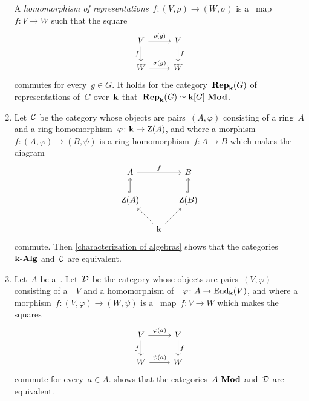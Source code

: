 \begin{example}
\begin{enumerate}
      A \emph{homomorphism of representations}~$f \colon (V, \rho) \to (W,\sigma)$ is a~{\klin} map~$f \colon V \to W$ such that the square
      \[
        \begin{tikzcd}
            V
            \arrow{r}[above]{\rho(g)}
            \arrow{d}[left]{f}
          & V
            \arrow{d}[right]{f}
          \\
            W
            \arrow{r}[above]{\sigma(g)}
          & W
        \end{tikzcd}
      \]
      commutes for every~$g \in G$.
      It holds for the category~$\mathbf{Rep}_{\mathbf{k}}(G)$ of representations of~$G$ over~$\kf$ that~$\mathbf{Rep}_{\mathbf{k}}(G) \simeq \text{$\mathbf{k}[G]$-$\mathbf{Mod}$}$.
    \item
      Let~$\mathcal{C}$ be the category whose objects are pairs~$(A, \varphi)$ consisting of a ring~$A$ and a ring homomorphism~$\varphi \colon \mathbf{k} \to \operatorname{Z}(A)$, and where a morphism~$f \colon (A, \varphi) \to (B, \psi)$ is a ring homomorphism~$f \colon A \to B$ which makes the diagram
      \[
        \begin{tikzcd}[column sep = small]
            A
            \arrow{rr}[above]{f}
          & {}
          & B
          \\
            \ringcenter(A)
            \arrow[hook]{u}
          & {}
          & \ringcenter(B)
            \arrow[hook]{u}
          \\
            {}
          & \kf
            \arrow{ul}
            \arrow{ur}
          & {}
        \end{tikzcd}
      \]
      commute.
      Then \cref{characterization of algebras} shows that the categories~$\text{$\mathbf{k}$-$\mathbf{Alg}$}$ and~$\mathcal{C}$ are equivalent.
    \item
      Let~$A$ be a~{\kalg}.
      Let~$\mathcal{D}$ be the category whose objects are pairs~$(V, \varphi)$ consisting of a~{\module{$\kf$}}~$V$ and a homomorphism of~{\kalgs}~$\varphi \colon A \to \operatorname{End}_{\mathbf{k}}(V)$, and where a morphism~$f \colon (V,\varphi) \to (W,\psi)$ is a~{\klin} map~$f \colon V \to W$ which makes the squares
      \[
        \begin{tikzcd}
            V
            \arrow{r}[above]{\varphi(a)}
            \arrow{d}[left]{f}
          & V
            \arrow{d}[right]{f}
          \\
            W
            \arrow{r}[above]{\psi(a)}
          & W
        \end{tikzcd}
      \]
      commute for every~$a \in A$.
       shows that the categories~$\text{$A$-$\mathbf{Mod}$}$ and~$\mathcal{D}$ are equivalent.
  \end{enumerate}
\end{example}




